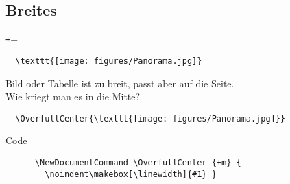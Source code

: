 \subsection{Breites}

\begin{frame}[fragile]{\texttt+\OverfullCenter+}
  \begin{verbatim}
  \texttt{[image: figures/Panorama.jpg]}
  \end{verbatim}
  Bild oder Tabelle ist zu breit, passt aber auf die Seite.\\
  Wie kriegt man es in die Mitte?
  \begin{verbatim}
  \OverfullCenter{\texttt{[image: figures/Panorama.jpg]}}
  \end{verbatim}

  \begin{block}{Code}
    \begin{verbatim}
      \NewDocumentCommand \OverfullCenter {+m} {
        \noindent\makebox[\linewidth]{#1} }
    \end{verbatim}
  \end{block}
\end{frame}

